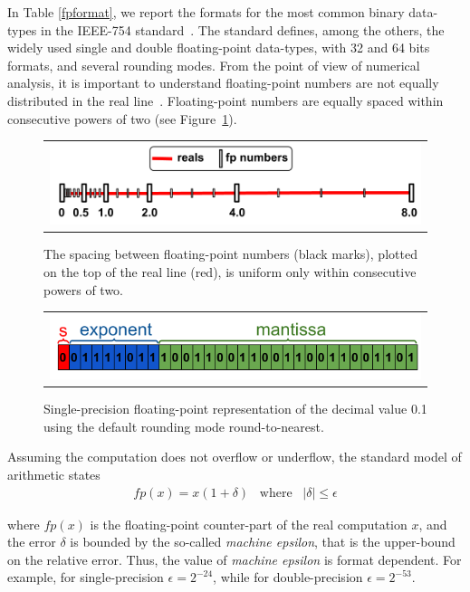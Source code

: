 In Table \ref{fpformat}, we report the formats for the most common binary data-types in the IEEE-754 standard~\cite{ieee754}.
%
The standard defines, among the others, the widely used single and double floating-point data-types, with 32 and 64 bits formats, and several rounding modes.
%
From the point of view of numerical analysis, it is important to understand floating-point numbers are not equally distributed in the real line~\cite{every}.
%
%
Floating-point numbers are equally spaced within consecutive powers of two (see Figure~\ref{fig:line}).
%
\begin{figure}[h!]
	\centering
	\begin{tabular}{l}
		\includegraphics[width=1.0\textwidth]{pic/fpnumbers.png}
	\end{tabular}
	\caption{The spacing between floating-point numbers (black marks), plotted on the top of the real line (red), is uniform only within consecutive powers of two.}
	\label{fig:line}
\end{figure}
%
\begin{figure}[h!]
	\centering
	\begin{tabular}{l}
		\includegraphics[width=1.0\textwidth]{pic/examplenumber.png}
	\end{tabular}
	\caption{Single-precision floating-point representation of the decimal value 0.1 using the default rounding mode round-to-nearest.}
	\label{fig:zeropointone}
\end{figure}
%
Assuming the computation does not overflow or underflow, the standard model of arithmetic states
%
\begin{align}
fp(x)=x(1+\delta)\;\;\;\text{where}\;\;\;|\delta|\leq\epsilon
\label{standard}
\end{align}
%

where $fp(x)$ is the floating-point counter-part of the real computation $x$, and the error $\delta$ is bounded by the so-called \emph{machine epsilon}, that is the upper-bound on the relative error.
%
Thus, the value of \emph{machine epsilon} is format dependent.
%
For example, for single-precision $\epsilon=2^{-24}$, while for double-precision $\epsilon=2^{-53}$.
%

